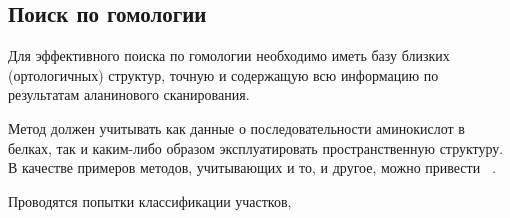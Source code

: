 \newpage
\subsection{Поиск по гомологии}
Для эффективного поиска по гомологии необходимо иметь базу близких (ортологичных) структур, точную и содержащую всю информацию по результатам аланинового сканирования.

Метод должен учитывать как данные о последовательности аминокислот в белках, так и каким-либо образом эксплуатировать пространственную структуру. В качестве примеров методов, учитывающих и то, и другое, можно привести ~\cite{hhm_svm}.

Проводятся попытки классификации участков, 
